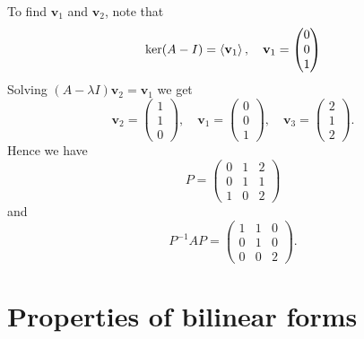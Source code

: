 \documentclass[a4paper]{article}
\begin{document}
\begin{example}
	To find $\mathbf{v}_1$ and $\mathbf{v}_2$, note that 
	\[
		\ker (A-I) = \left\langle{} \mathbf{v}_1 \right\rangle,\quad \mathbf{v}_1 = \begin{pmatrix}
			 0 \\
			 0 \\
			 1 \\
		\end{pmatrix}
	\]
	Solving $ (A-\lambda I)\mathbf{v}_2 = \mathbf{v}_1 $ we get 
	\[
		\mathbf{v}_2 =
		\begin{pmatrix}
		  1\\1\\0
		\end{pmatrix},\quad
		\mathbf{v}_1 =
		\begin{pmatrix}
		  0\\0\\1
		\end{pmatrix},\quad
		\mathbf{v}_3 =
		\begin{pmatrix}
		  2\\1\\2
		\end{pmatrix}.
	  \]
	Hence we have
	\[
	  P =
	  \begin{pmatrix}
		0 & 1 & 2\\
		0 & 1 & 1\\
		1 & 0 & 2
	  \end{pmatrix}
	\]
	and
	\[
	  P^{-1} AP = \begin{pmatrix}
		1 & 1 & 0\\
		0 & 1 & 0\\
		0 & 0 & 2
	  \end{pmatrix}.
	\]
  \end{example}

\section{Properties of bilinear forms}
\end{document}

